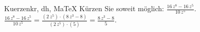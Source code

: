 \begin{MAufgabe}{Kuerzen}{kr, dh, MaTeX}
K\"urzen Sie soweit m\"oglich: $\frac{16\, z^8 - 16\, z^5}{10\, z^5}$.\\ 
\ifLsg\MLoesung
\quad $\frac{16\, z^8 - 16\, z^5}{10\, z^5}=\frac{(2\, z^5)\cdot(8\, z^3 - 8)}{(2\, z^5)\cdot(5)}=\frac{8\, z^3 - 8}{5}$.\else\relax\fi
 \end{MAufgabe}